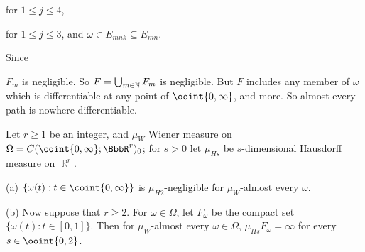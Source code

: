 {

\noindent for $1\le j\le 4$,


\noindent for $1\le j\le 3$, and $\omega\in E_{mnk}\subseteq E_{mn}$.\ \Qed

Since


\noindent $F_m$ is negligible.   So $F=\bigcup_{m\in\Bbb N}F_m$ is
negligible.   But $F$ includes any member of $\omega$ which is
differentiable at any point of $\ooint{0,\infty}$, and more.   So almost
every path is nowhere differentiable.
}%

 Let $r\ge 1$ be an integer,
and $\mu_W$ Wiener measure on $\Omega=C(\coint{0,\infty};\BbbR^r)_0$;
for $s>0$ let $\mu_{Hs}$ be $s$-dimensional Hausdorff measure on
$\BbbR^r$.

(a)
$\{\omega(t):t\in\coint{0,\infty}\}$ is $\mu_{H2}$-negligible
for $\mu_W$-almost every $\omega$.

(b) Now suppose that $r\ge 2$.   For
$\omega\in\Omega$, let $F_{\omega}$ be the compact set
$\{\omega(t):t\in[0,1]\}$.
Then for $\mu_W$-almost every $\omega\in\Omega$,
$\mu_{Hs}F_{\omega}=\infty$ for every $s\in\ooint{0,2}$.

